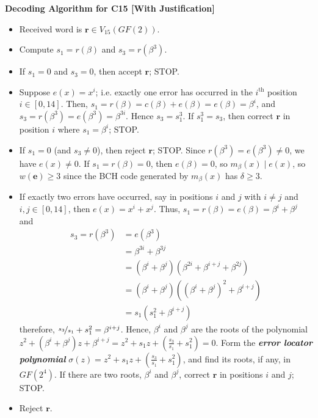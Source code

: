\begin{algbox}
    \textbf{Decoding Algorithm for C15 [With Justification]}
    \begin{itemize}
        \item Received word is $ \bm{r}\in V_{15}(GF(2)) $.
        \item Compute $ s_1=r(\beta) $ and $ s_3=r(\beta^3) $.
        \item If $ s_1=0 $ and $ s_3=0 $, then accept $ \bm{r} $; STOP.
        \item Suppose $ e(x)=x^i $; i.e. exactly one error has occurred in the $ i^{\text{th}} $
              position $ i\in[0,14] $. Then, $ s_1=r(\beta)=c(\beta)+e(\beta)=e(\beta)=\beta^i $,
              and $ s_3=r(\beta^3)=e(\beta^3)=\beta^{3i} $. Hence $ s_3=s_1^3 $.
              If $ s_1^3=s_3 $, then correct $ \bm{r} $ in position $ i $ where $ s_1=\beta^i $;
              STOP.
        \item If $ s_1=0 $ (and $ s_3\neq 0 $), then reject $ \bm{r} $; STOP.
              Since $ r(\beta^3)=e(\beta^3)\neq 0 $, we have $ e(x)\neq 0 $. If $ s_1=r(\beta)=0 $,
              then $ e(\beta)=0 $, so $ m_{\beta}(x)\mid e(x) $, so $ w(\bm{e})\geqslant 3 $
              since the BCH code generated by $ m_{\beta}(x) $ has $ \delta\geqslant 3 $.
        \item If exactly two errors have occurred, say in positions $ i $ and $ j $ with
              $ i\neq j $ and $ i,j\in[0,14] $, then $ e(x)=x^i+x^j $. Thus, $ s_1=r(\beta)=
                  e(\beta)=\beta^i+\beta^j $ and
              \begin{align*}
                  s_3=r(\beta^3)
                   & =e(\beta^3)                                           \\
                   & =\beta^{3i}+\beta^{3j}                                \\
                   & =(\beta^i+\beta^j)(\beta^{2i}+\beta^{i+j}+\beta^{2j}) \\
                   & =(\beta^i+\beta^j)((\beta^i+\beta^j)^2+\beta^{i+j})   \\
                   & =s_1(s_1^2+\beta^{i+j})
              \end{align*}
              therefore, $ \nicefrac{s_3}{s_1}+s_1^2=\beta^{i+j} $. Hence, $ \beta^i $
              and $ \beta^j $ are the roots of the polynomial $ z^2+(\beta^i+\beta^j)z+\beta^{i+j}=
                  z^2+s_1z+\left( \frac{s_3}{s_1} +s_1^2 \right)=0 $. Form the
              \textbf\emph{{error locator polynomial}}
              $ \sigma(z)=z^2+s_1z+\left( \frac{s_3}{s_1} +s_1^2 \right) $, and find its
              roots, if any, in $ GF(2^4) $. If there are two roots, $ \beta^i $
              and $ \beta^j $, correct $ \bm{r} $ in positions $ i $ and $ j $; STOP.
        \item Reject $ \bm{r} $.
    \end{itemize}
\end{algbox}

